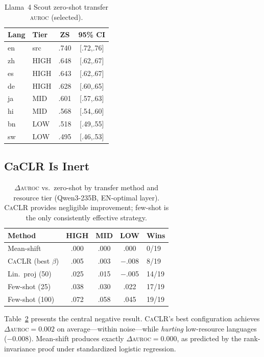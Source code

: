 \documentclass[11pt,a4paper]{article}
\newcommand{\auroc}{\textsc{auroc}}
\newcommand{\caclr}{\textsc{CaCLR}}
\begin{document}
\begin{table}[t]
\centering
\small
\begin{tabular}{llcc}
\toprule
\textbf{Lang} & \textbf{Tier} & \textbf{ZS} & \textbf{95\% CI} \\
\midrule
en & src & .740 & [.72,.76] \\
zh & HIGH & .648 & [.62,.67] \\
es & HIGH & .643 & [.62,.67] \\
de & HIGH & .628 & [.60,.65] \\
ja & MID & .601 & [.57,.63] \\
hi & MID & .568 & [.54,.60] \\
bn & LOW & .518 & [.49,.55] \\
sw & LOW & .495 & [.46,.53] \\
\bottomrule
\end{tabular}
\caption{Llama~4 Scout zero-shot transfer \auroc{} (selected).}
\label{tab:scout-zs}
\end{table}

\subsection{CaCLR Is Inert}
\label{sec:caclr-results}

\begin{table}[t]
\centering
\small
\begin{tabular}{lcccl}
\toprule
\textbf{Method} & \textbf{HIGH} & \textbf{MID} & \textbf{LOW} & \textbf{Wins} \\
\midrule
Mean-shift & .000 & .000 & .000 & 0/19 \\
\caclr{} (best $\beta$) & .005 & .003 & $-$.008 & 8/19 \\
Lin.\ proj (50) & .025 & .015 & $-$.005 & 14/19 \\
Few-shot (25) & .038 & .030 & .022 & 17/19 \\
Few-shot (100) & .072 & .058 & .045 & 19/19 \\
\bottomrule
\end{tabular}
\caption{$\Delta$\auroc{} vs.\ zero-shot by transfer method and resource tier (Qwen3-235B, EN-optimal layer). \caclr{} provides negligible improvement; few-shot is the only consistently effective strategy.}
\label{tab:transfer-comparison}
\end{table}

Table~\ref{tab:transfer-comparison} presents the central negative result.
\caclr{}'s best configuration achieves $\Delta$\auroc{}$=0.002$ on average---within noise---while \emph{hurting} low-resource languages ($-$0.008).
Mean-shift produces exactly $\Delta$\auroc{}$=0.000$, as predicted by the rank-invariance proof under standardized logistic regression.
\end{document}
